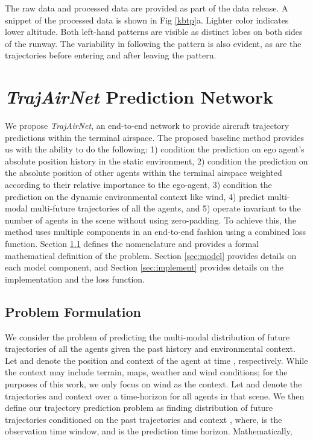 \documentclass[letterpaper, 10 pt, conference]{ieeeconf}
\begin{document}
The raw data and processed data are provided as part of the data release. A snippet of the processed data is shown in Fig \ref{kbtp}a. Lighter color indicates lower altitude. Both left-hand patterns are visible as distinct lobes on both sides of the runway. The variability in following the pattern is also evident, as are the trajectories before entering and after leaving the pattern.    
\section{\textit{TrajAirNet} Prediction Network}\label{sec:trajairnet}


We propose \textit{TrajAirNet}, an end-to-end network to provide aircraft trajectory predictions within the terminal airspace. The proposed baseline method provides us with the ability to do the following: 1) condition the prediction on ego agent's absolute position history in the static environment, 2) condition the prediction on the absolute position of other agents within the terminal airspace weighted according to their relative importance to the ego-agent, 3) condition the prediction on the dynamic environmental context like wind, 4) predict multi-modal multi-future trajectories of all the agents, and 5) operate invariant to the number of agents in the scene without using zero-padding. To achieve this, the method uses multiple components in an end-to-end fashion using a combined loss function. Section \ref{sec:problem} defines the nomenclature and provides a formal mathematical definition of the problem. Section \ref{sec:model} provides details on each model component, and Section \ref{sec:implement} provides details on the implementation and the loss function. 
\subsection{Problem Formulation}\label{sec:problem}
We consider the problem of predicting the multi-modal distribution of future trajectories of all the agents given the past history and environmental context. Let  and  denote the position and context of the  agent at time , respectively. While the context may include terrain, maps, weather and wind conditions; for the purposes of this work, we only focus on wind as the context. Let  and  denote the trajectories and context over a  time-horizon for all  agents in that scene. We then define our trajectory prediction problem as finding distribution of future trajectories  conditioned on the past trajectories  and context , where,  is the observation time window, and  is the prediction time horizon. Mathematically,     
\end{document}
